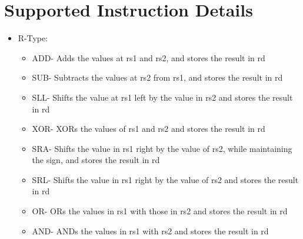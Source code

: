 \documentclass[10pt,letterpaper]{article}
\begin{document}
\section{Supported Instruction Details}
\begin{itemize}
	\item R-Type:
		\begin{itemize}
			\item ADD- Adds the values at rs1 and rs2, and stores the result in rd
			\item SUB- Subtracts the values at rs2 from rs1, and stores the result in rd
			\item SLL- Shifts the value at rs1 left by the value in rs2 and stores the result in rd
			\item XOR- XORs the values of rs1 and rs2 and stores the result in rd
			\item SRA- Shifts the value in rs1 right  by the value of rs2, while maintaining the sign, and stores the result in rd
			\item SRL- Shifts the value in rs1 right by the value of rs2 and stores the result in rd
			\item OR- ORs the values in rs1 with those in rs2 and stores the result in rd
			\item AND- ANDs the values in rs1 with rs2 and stores the result in rd
		\end{itemize}




\end{itemize}
\end{document}
